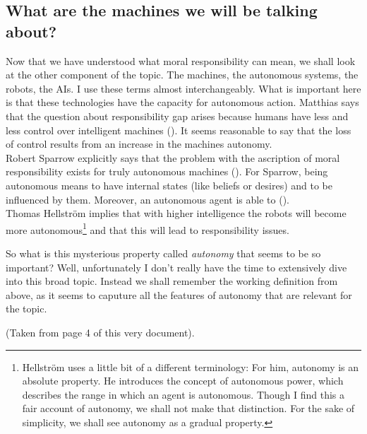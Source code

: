 \documentclass{article}
\begin{document}
\subsection{What are the machines we will be talking about?}

Now that we have understood what moral responsibility can mean, we shall look at
the other component of the topic. The machines, the autonomous systems, the
robots, the AIs. I use these terms almost interchangeably. What is important
here is that these technologies have the capacity for autonomous action.
Matthias says that the question about responsibility gap arises because humans
have less and less control over intelligent machines (\cite[p.
175]{Matthias_2004}). It seems reasonable to say that the loss of control
results from an increase in the machines autonomy.\\ 
Robert Sparrow explicitly says that the problem with the ascription of moral
responsibility exists for truly autonomous machines (\cite[p.
64-65]{sparrow2007killer}). For Sparrow, being autonomous means to have internal
states (like beliefs or desires) and to be influenced by them. Moreover, an
autonomous agent is able to 
(\cite[p. 65]{sparrow2007killer}).\\
\label{sparrow_autonomy}
Thomas Hellström implies that with higher intelligence the robots will
become more autonomous\footnote{Hellström uses a little bit of a
		different terminology: For him, autonomy is an absolute
		property. He introduces the concept of autonomous power, which
		describes the range in which an agent is autonomous. Though I
		find this a fair account of autonomy, we shall not make that
		distinction. For the sake of simplicity, we shall see autonomy
as a gradual property.} and that this will lead to responsibility issues.

So what is this mysterious property called \textit{autonomy} that seems to be so
important? Well, unfortunately I don't really have the time to extensively dive
into this broad topic. Instead we shall remember the working definition from
above, as it seems to caputure all the features of autonomy that are relevant
for the topic.

 (Taken
from page 4 of this very document).
\end{document}
